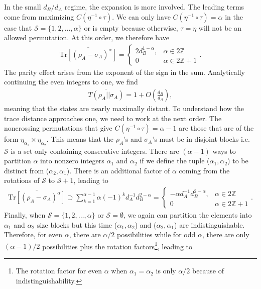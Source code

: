 \documentclass[a4paper,11pt]{article}
\newcommand{\Tr}{\text{Tr}}
\newcommand*{\SR}[1]{\textcolor{magenta}{[SR: \textsf{#1}]}}
\begin{document}
In the small $d_B/d_A$ regime, 
the expansion is
more involved. The leading terms come from maximizing $C(\eta^{-1}\circ\tau)$. We can only have $C(\eta^{-1}\circ\tau) = 
\alpha$ in the case that $\mathcal{S} = \{ 1,2,\dots, \alpha\}$ or is empty because otherwise, $\tau = \eta$ will not be an allowed permutation. At this order, we therefore have
\begin{align}
    \overline{\Tr\left[ (\rho_A- \sigma_A)^{\alpha}\right]} = \begin{cases}
       2 d_B^{1-\alpha}, & \alpha \in 2\mathbb{Z}
       \\
       0 & \alpha \in 2\mathbb{Z} + 1
    \end{cases}.
\end{align}
The parity effect arises from the exponent of the sign in the sum. Analytically continuing the even integers to one, we find
\begin{align}
    \overline{T(\rho_A || \sigma_A)} = 1 + O\left( \frac{d_B}{d_A}\right),
\end{align}
meaning that the states are nearly maximally distant. To understand how the trace distance approaches one, we need to work at the next order. The noncrossing permutations that give $C(\eta^{-1}\circ\tau) = 
\alpha - 1$ are those that are of the form $\eta_{\alpha_1}\times \eta_{\alpha_2}$. This means that the $\rho_A$'s and $\sigma_A$'s must be in disjoint blocks i.e.~$\mathcal{S}$ is a set only containing consecutive integers. There are $(\alpha-1)$ ways to partition $\alpha$ into nonzero integers $\alpha_1$ and $\alpha_2$ if we define the tuple ($\alpha_1, \alpha_2$) to be distinct from ($\alpha_2, \alpha_1$). There is an additional factor of $\alpha$ coming from the rotations of $\mathcal{S}$ to $\mathcal{S}+1$, leading to  
\begin{align}
    \overline{\Tr\left[ (\rho_A- \sigma_A)^{\alpha}\right]} \supset \sum_{k = 1}^{\alpha -1}\alpha(-1)^{k}d_A^{-1}d_B^{2-{\alpha}} = \begin{cases}
       -\alpha d_A^{-1}d_B^{2-{\alpha}}, & \alpha \in 2\mathbb{Z}
       \\
       0 & \alpha \in 2\mathbb{Z} + 1
    \end{cases}.
\end{align}
Finally, when $\mathcal{S} = \{ 1,2,\dots, \alpha\}$ or $\mathcal{S} = \emptyset$, we again can partition the elements into $\alpha_1$ and $\alpha_2$ size blocks but this time ($\alpha_1, \alpha_2$) and ($\alpha_2, \alpha_1$) are indistinguishable. Therefore, for even $\alpha$, there are $\alpha/2$ possibilities while for odd $\alpha$, there are only $(\alpha-1)/2$ possibilities plus the rotation factors\footnote{The rotation factor for even $\alpha$ when $\alpha_1 =\alpha_2$ is only $\alpha/2$ because of indistinguishability.}, leading to
\end{document}
